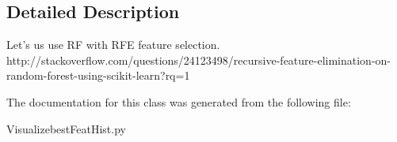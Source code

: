 \subsection{Detailed Description}
\begin{DoxyVerb}Let's us use RF with RFE feature selection.
http://stackoverflow.com/questions/24123498/recursive-feature-elimination-on-random-forest-using-scikit-learn?rq=1
\end{DoxyVerb}
 

The documentation for this class was generated from the following file\+:\begin{DoxyCompactItemize}
\item 
Visualizebest\+Feat\+Hist.\+py\end{DoxyCompactItemize}
